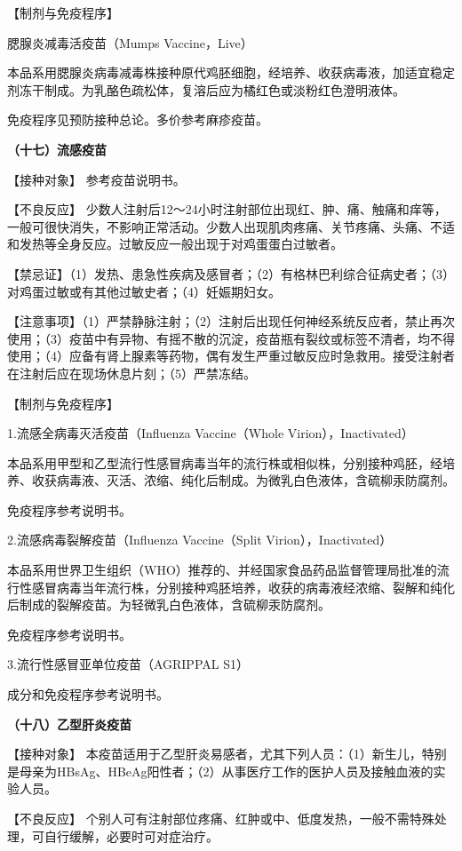 【制剂与免疫程序】

腮腺炎减毒活疫苗（Mumps Vaccine，Live）

本品系用腮腺炎病毒减毒株接种原代鸡胚细胞，经培养、收获病毒液，加适宜稳定剂冻干制成。为乳酪色疏松体，复溶后应为橘红色或淡粉红色澄明液体。

免疫程序见预防接种总论。多价参考麻疹疫苗。

\textbf{（十七）流感疫苗}

【接种对象】 参考疫苗说明书。

【不良反应】
少数人注射后12～24小时注射部位出现红、肿、痛、触痛和痒等，一般可很快消失，不影响正常活动。少数人出现肌肉疼痛、关节疼痛、头痛、不适和发热等全身反应。过敏反应一般出现于对鸡蛋蛋白过敏者。

【禁忌证】（1）发热、患急性疾病及感冒者；（2）有格林巴利综合征病史者；（3）对鸡蛋过敏或有其他过敏史者；（4）妊娠期妇女。

【注意事项】（1）严禁静脉注射；（2）注射后出现任何神经系统反应者，禁止再次使用；（3）疫苗中有异物、有摇不散的沉淀，疫苗瓶有裂纹或标签不清者，均不得使用；（4）应备有肾上腺素等药物，偶有发生严重过敏反应时急救用。接受注射者在注射后应在现场休息片刻；（5）严禁冻结。

【制剂与免疫程序】

1.流感全病毒灭活疫苗（Influenza Vaccine（Whole Virion），Inactivated）

本品系用甲型和乙型流行性感冒病毒当年的流行株或相似株，分别接种鸡胚，经培养、收获病毒液、灭活、浓缩、纯化后制成。为微乳白色液体，含硫柳汞防腐剂。

免疫程序参考说明书。

2.流感病毒裂解疫苗（Influenza Vaccine（Split Virion），Inactivated）

本品系用世界卫生组织（WHO）推荐的、并经国家食品药品监督管理局批准的流行性感冒病毒当年流行株，分别接种鸡胚培养，收获的病毒液经浓缩、裂解和纯化后制成的裂解疫苗。为轻微乳白色液体，含硫柳汞防腐剂。

免疫程序参考说明书。

3.流行性感冒亚单位疫苗（AGRIPPAL S1）

成分和免疫程序参考说明书。

\textbf{（十八）乙型肝炎疫苗}

【接种对象】
本疫苗适用于乙型肝炎易感者，尤其下列人员：（1）新生儿，特别是母亲为HBsAg、HBeAg阳性者；（2）从事医疗工作的医护人员及接触血液的实验人员。

【不良反应】
个别人可有注射部位疼痛、红肿或中、低度发热，一般不需特殊处理，可自行缓解，必要时可对症治疗。

